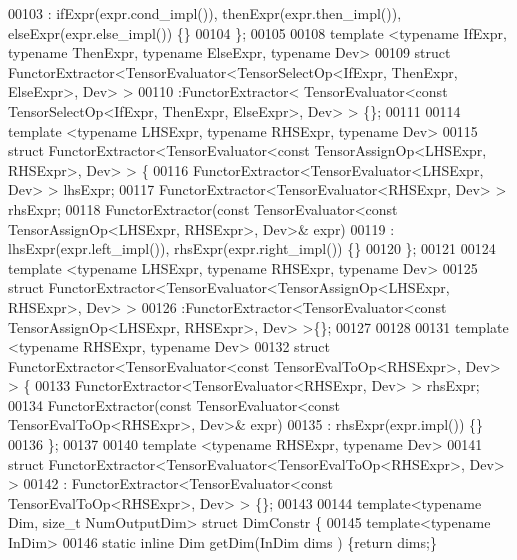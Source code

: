 \begin{DoxyCode}
00103   : ifExpr(expr.cond\_impl()), thenExpr(expr.then\_impl()), elseExpr(expr.else\_impl()) \{\}
00104 \};
00105 
00108 \textcolor{keyword}{template} <\textcolor{keyword}{typename} IfExpr, \textcolor{keyword}{typename} ThenExpr, \textcolor{keyword}{typename} ElseExpr, \textcolor{keyword}{typename} Dev>
00109 \textcolor{keyword}{struct }FunctorExtractor<TensorEvaluator<TensorSelectOp<IfExpr, ThenExpr, ElseExpr>, Dev> >
00110 :FunctorExtractor< TensorEvaluator<const TensorSelectOp<IfExpr, ThenExpr, ElseExpr>, Dev> > \{\};
00111 
00114 \textcolor{keyword}{template} <\textcolor{keyword}{typename} LHSExpr, \textcolor{keyword}{typename} RHSExpr, \textcolor{keyword}{typename} Dev>
00115 \textcolor{keyword}{struct }FunctorExtractor<TensorEvaluator<const TensorAssignOp<LHSExpr, RHSExpr>, Dev> > \{
00116   FunctorExtractor<TensorEvaluator<LHSExpr, Dev> > lhsExpr;
00117   FunctorExtractor<TensorEvaluator<RHSExpr, Dev> > rhsExpr;
00118   FunctorExtractor(\textcolor{keyword}{const} TensorEvaluator<\textcolor{keyword}{const} TensorAssignOp<LHSExpr, RHSExpr>, Dev>& expr)
00119   : lhsExpr(expr.left\_impl()), rhsExpr(expr.right\_impl()) \{\}
00120 \};
00121 
00124 \textcolor{keyword}{template} <\textcolor{keyword}{typename} LHSExpr, \textcolor{keyword}{typename} RHSExpr, \textcolor{keyword}{typename} Dev>
00125 \textcolor{keyword}{struct }FunctorExtractor<TensorEvaluator<TensorAssignOp<LHSExpr, RHSExpr>, Dev> >
00126 :FunctorExtractor<TensorEvaluator<const TensorAssignOp<LHSExpr, RHSExpr>, Dev> >\{\};
00127 
00128 
00131 \textcolor{keyword}{template} <\textcolor{keyword}{typename} RHSExpr, \textcolor{keyword}{typename} Dev>
00132 \textcolor{keyword}{struct }FunctorExtractor<TensorEvaluator<const TensorEvalToOp<RHSExpr>, Dev> > \{
00133   FunctorExtractor<TensorEvaluator<RHSExpr, Dev> > rhsExpr;
00134   FunctorExtractor(\textcolor{keyword}{const} TensorEvaluator<\textcolor{keyword}{const} TensorEvalToOp<RHSExpr>, Dev>& expr)
00135   : rhsExpr(expr.impl()) \{\}
00136 \};
00137 
00140 \textcolor{keyword}{template} <\textcolor{keyword}{typename} RHSExpr, \textcolor{keyword}{typename} Dev>
00141 \textcolor{keyword}{struct }FunctorExtractor<TensorEvaluator<TensorEvalToOp<RHSExpr>, Dev> >
00142 : FunctorExtractor<TensorEvaluator<const TensorEvalToOp<RHSExpr>, Dev> > \{\};
00143 
00144 \textcolor{keyword}{template}<\textcolor{keyword}{typename} Dim, \textcolor{keywordtype}{size\_t} NumOutputDim> \textcolor{keyword}{struct }DimConstr \{
00145 \textcolor{keyword}{template}<\textcolor{keyword}{typename} InDim>
00146   \textcolor{keyword}{static} \textcolor{keyword}{inline} Dim getDim(InDim dims ) \{\textcolor{keywordflow}{return} dims;\}

\end{DoxyCode}
